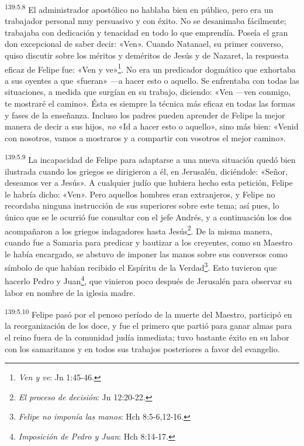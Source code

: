 \par 
\textsuperscript{139:5.8} El administrador apostólico no hablaba bien en público, pero era un trabajador personal muy persuasivo y con éxito. No se desanimaba fácilmente; trabajaba con dedicación y tenacidad en todo lo que emprendía. Poseía el gran don excepcional de saber decir: «Ven». Cuando Natanael, su primer converso, quiso discutir sobre los méritos y deméritos de Jesús y de Nazaret, la respuesta eficaz de Felipe fue: «Ven y ve»\footnote{\textit{Ven y ve}: Jn 1:45-46.}. No era un predicador dogmático que exhortaba a sus oyentes a que «fueran» ---a hacer esto o aquello. Se enfrentaba con todas las situaciones, a medida que surgían en su trabajo, diciendo: «Ven ---ven conmigo, te mostraré el camino». Ésta es siempre la técnica más eficaz en todas las formas y fases de la enseñanza. Incluso los padres pueden aprender de Felipe la mejor manera de decir a sus hijos, \textit{no} «Id a hacer esto o aquello», sino más bien: «Venid con nosotros, vamos a mostraros y a compartir con vosotros el mejor camino».

\par 
\textsuperscript{139:5.9} La incapacidad de Felipe para adaptarse a una nueva situación quedó bien ilustrada cuando los griegos se dirigieron a él, en Jerusalén, diciéndole: «Señor, deseamos ver a Jesús». A cualquier judío que hubiera hecho esta petición, Felipe le habría dicho: «Ven». Pero aquellos hombres eran extranjeros, y Felipe no recordaba ninguna instrucción de sus superiores sobre este tema; así pues, lo único que se le ocurrió fue consultar con el jefe Andrés, y a continuación los dos acompañaron a los griegos indagadores hasta Jesús\footnote{\textit{El proceso de decisión}: Jn 12:20-22.}. De la misma manera, cuando fue a Samaria para predicar y bautizar a los creyentes, como su Maestro le había encargado, se abstuvo de imponer las manos sobre sus conversos como símbolo de que habían recibido el Espíritu de la Verdad\footnote{\textit{Felipe no imponía las manos}: Hch 8:5-6,12-16.}. Esto tuvieron que hacerlo Pedro y Juan\footnote{\textit{Imposición de Pedro y Juan}: Hch 8:14-17.}, que vinieron poco después de Jerusalén para observar su labor en nombre de la iglesia madre.

\par 
\textsuperscript{139:5.10} Felipe pasó por el penoso período de la muerte del Maestro, participó en la reorganización de los doce, y fue el primero que partió para ganar almas para el reino fuera de la comunidad judía inmediata; tuvo bastante éxito en su labor con los samaritanos y en todos sus trabajos posteriores a favor del evangelio.


